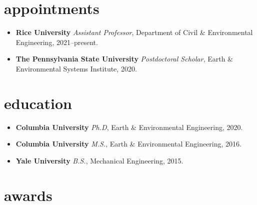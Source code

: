 \documentclass[10pt,oneside]{article}
\begin{document}

\section{appointments}

\mbox{}\vspace{-\dimexpr\baselineskip\relax}

\begin{itemize}[label={}]
  
  \item \textbf{Rice University}
        \textit{Assistant Professor}, Department of Civil \& Environmental Engineering, 2021--present.
  
  \item \textbf{The Pennsylvania State University}
        \textit{Postdoctoral Scholar}, Earth \& Environmental Systems Institute, 2020.
  
\end{itemize}


\section{education}

\mbox{}\vspace{-\dimexpr\baselineskip\relax}

\begin{itemize}[label={}]
  
  \item \textbf{Columbia University}
        \textit{Ph.D}, Earth \& Environmental Engineering, 2020.
  
  \item \textbf{Columbia University}
        \textit{M.S.}, Earth \& Environmental Engineering, 2016.
  
  \item \textbf{Yale University}
        \textit{B.S.}, Mechanical Engineering, 2015.
  
\end{itemize}


\section{awards}

\mbox{}\vspace{-\dimexpr\baselineskip\relax}
\end{document}
